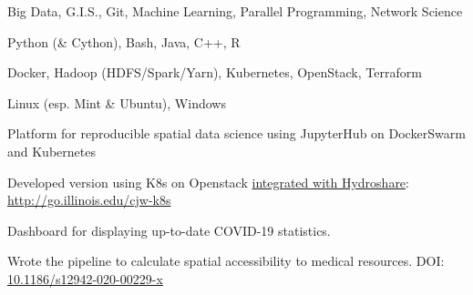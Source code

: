 \documentclass{acmresume}
\begin{document}
        \begin{titemize}
        \end{titemize}
		
        \begin{titemize}
        \end{titemize}
    
        \begin{description}[topsep=1pt,itemsep=1pt]
        	 Big Data, G.I.S., Git, Machine Learning, Parallel Programming, Network Science
        	
        	 Python (\& Cython), Bash, Java, C++, R
        	
        	 Docker, Hadoop (HDFS/Spark/Yarn), Kubernetes, OpenStack, Terraform
        	
        	 Linux (esp. Mint \& Ubuntu), Windows
        \end{description}
    
    
    
    \begin{titemize}
    	\item Platform for reproducible spatial data science using JupyterHub on DockerSwarm and Kubernetes
    	\item Developed version using K8s on Openstack \href{https://www.hydroshare.org/resource/e9686eadd4474b6587d83d9330d25854/}{integrated with Hydroshare}: \href{http://go.illinois.edu/cjw-k8s}{http://go.illinois.edu/cjw-k8s}
    \end{titemize}
    
    \begin{titemize}
    	\item Dashboard for displaying up-to-date COVID-19 statistics.
    	\item Wrote the pipeline to calculate spatial accessibility to medical resources. DOI: \href{https://doi.org/10.1186/s12942-020-00229-x}{10.1186/s12942-020-00229-x}
    \end{titemize}

	
\end{document}
